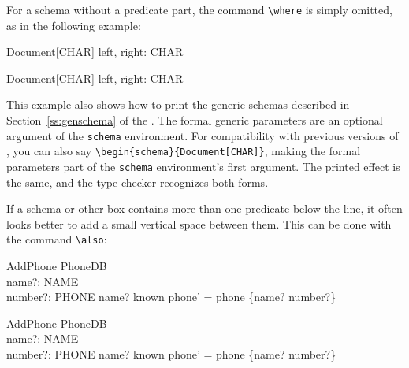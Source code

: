 For a schema without a predicate part, the command \verb/\where/ is
simply omitted, as in the following example:
\begin{demo}
\begin{schema}{Document}[CHAR]
    left, right: \seq CHAR
\end{schema}
\gives
\begin{schema}{Document}[CHAR]
    left, right: \seq CHAR
\end{schema}
\end{demo}
This example also shows how to print the generic schemas described in
\ifmanual 
  Section~\ref{ss:genschema} of 
\fi 
the \ZRM.  The formal generic
parameters are an optional argument of the
\verb/schema/ environment.
For compatibility with previous versions of %
\fuzz{}, you can also say
\verb/\begin{schema}{Document[CHAR]}/,
making the formal parameters part of the \verb/schema/ environment's
first argument.  The printed effect is the same, and the
type checker recognizes both forms.

If a schema or other box contains more than one predicate below the
line, it often looks better to add a small vertical space between them.
This can be done with the command \verb/\also/\index{|\also|}:
\begin{demo}
\begin{schema}{AddPhone}
    \Delta PhoneDB \\
    name?: NAME \\
    number?: PHONE
\where
    name? \notin known
\also
    phone' = phone \oplus \{name? \mapsto number?\}
\end{schema}
\gives
\begin{schema}{AddPhone}
    \Delta PhoneDB \\
    name?: NAME \\
    number?: PHONE
\where
    name? \notin known
\also
    phone' = phone \oplus \{name? \mapsto number?\}
\end{schema}
\end{demo}

